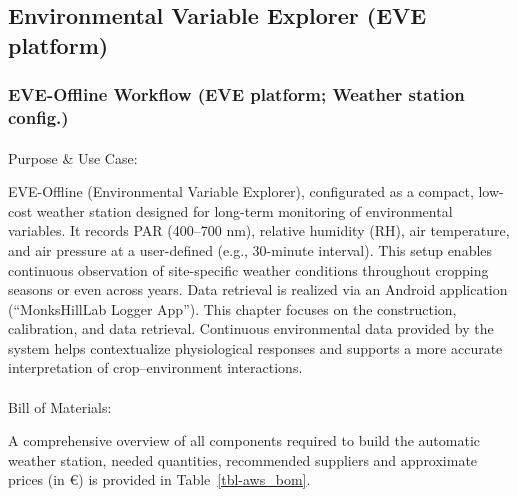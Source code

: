\documentclass[
  11pt,
  letterpaper,
]{book}
\makeatletter
\let\oldparagraph\paragraph
\renewcommand{\paragraph}{
    \@ifstar
      \xxxParagraphStar
      \xxxParagraphNoStar
  }
\newcommand{\xxxParagraphStar}[1]{\oldparagraph*{#1}\mbox{}}
\newcommand{\xxxParagraphNoStar}[1]{\oldparagraph{#1}\mbox{}}
\makeatother
\begin{document}
\subsection{Environmental Variable Explorer (EVE
platform)}\label{sec-eve-platform}

\subsubsection{EVE-Offline Workflow (EVE platform; Weather station
config.)}\label{sec-eve-offline}

\paragraph{Purpose \& Use Case:}\label{sec-eve-offline-purpose}

EVE-Offline (Environmental Variable Explorer), configurated as a
compact, low-cost weather station designed for long-term monitoring of
environmental variables. It records PAR (400--700 nm), relative humidity
(RH), air temperature, and air pressure at a user-defined (e.g.,
30-minute interval). This setup enables continuous observation of
site-specific weather conditions throughout cropping seasons or even
across years. Data retrieval is realized via an Android application
(``MonksHillLab Logger App''). This chapter focuses on the construction,
calibration, and data retrieval. Continuous environmental data provided
by the system helps contextualize physiological responses and supports a
more accurate interpretation of crop--environment interactions.

\paragraph{Bill of Materials:}\label{sec-eve-offline-bom}

A comprehensive overview of all components required to build the
automatic weather station, needed quantities, recommended suppliers and
approximate prices (in €) is provided in Table~\ref{tbl-aws_bom}.
\end{document}
